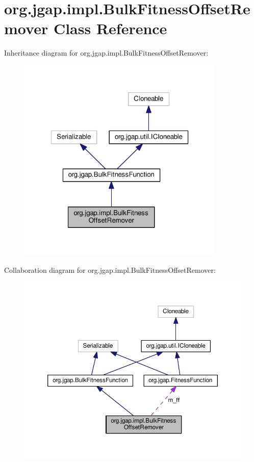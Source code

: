 \hypertarget{classorg_1_1jgap_1_1impl_1_1_bulk_fitness_offset_remover}{\section{org.\-jgap.\-impl.\-Bulk\-Fitness\-Offset\-Remover Class Reference}
\label{classorg_1_1jgap_1_1impl_1_1_bulk_fitness_offset_remover}
}


Inheritance diagram for org.\-jgap.\-impl.\-Bulk\-Fitness\-Offset\-Remover\-:
\nopagebreak
\begin{figure}[H]
\begin{center}
\leavevmode
\includegraphics[width=280pt]{classorg_1_1jgap_1_1impl_1_1_bulk_fitness_offset_remover__inherit__graph}
\end{center}
\end{figure}


Collaboration diagram for org.\-jgap.\-impl.\-Bulk\-Fitness\-Offset\-Remover\-:
\nopagebreak
\begin{figure}[H]
\begin{center}
\leavevmode
\includegraphics[width=350pt]{classorg_1_1jgap_1_1impl_1_1_bulk_fitness_offset_remover__coll__graph}
\end{center}
\end{figure}
